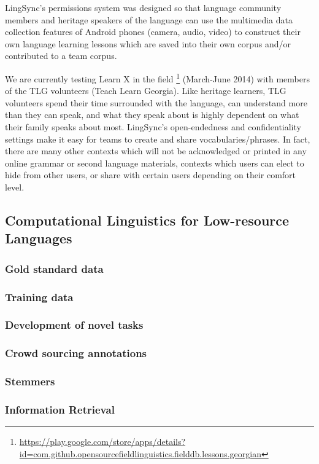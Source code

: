 \documentclass[11pt]{article}
\begin{document}
LingSync's permissions system was designed so that language community members
and heritage speakers of the language can use the multimedia data collection
features of Android phones (camera, audio, video) to construct their own
language learning lessons which are saved into their own corpus and/or
contributed to a team corpus.

We are currently testing Learn X in the field%
\footnote{\url{https://play.google.com/store/apps/details?id=com.github.opensourcefieldlinguistics.fielddb.lessons.georgian}} %
(March-June 2014) with members of the TLG volunteers (Teach Learn Georgia).
Like heritage learners, TLG volunteers spend their time surrounded with the
language, can understand more than they can speak, and what they speak about is
highly dependent on what their family speaks about most. LingSync's
open-endedness and confidentiality settings make it easy for teams to create
and share vocabularies/phrases.
In fact, there are many other contexts which will not be acknowledged or printed
in any online grammar or second language materials, contexts which users can
elect to hide from other users, or share with certain users depending on their
comfort level.


\subsection{Computational Linguistics for Low-resource Languages}


\subsubsection{Gold standard data}
\subsubsection{Training data}
\subsubsection{Development of novel tasks}
\subsubsection{Crowd sourcing annotations}
\subsubsection{Stemmers}
\subsubsection{Information Retrieval}
\end{document}
